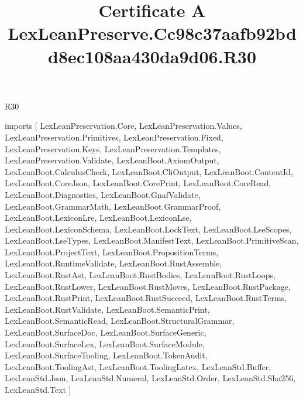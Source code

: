 \begin{lexlean}{R30}
\title{Certificate A LexLeanPreserve.Cc98c37aafb92bdd8ec108aa430da9d06.R30}
\begin{coremodule}
imports [
  LexLeanPreservation.Core,
  LexLeanPreservation.Values,
  LexLeanPreservation.Primitives,
  LexLeanPreservation.Fixed,
  LexLeanPreservation.Keys,
  LexLeanPreservation.Templates,
  LexLeanPreservation.Validate,
  LexLeanBoot.AxiomOutput,
  LexLeanBoot.CalculusCheck,
  LexLeanBoot.CliOutput,
  LexLeanBoot.ContentId,
  LexLeanBoot.CoreJson,
  LexLeanBoot.CorePrint,
  LexLeanBoot.CoreRead,
  LexLeanBoot.Diagnostics,
  LexLeanBoot.GnafValidate,
  LexLeanBoot.GrammarMath,
  LexLeanBoot.GrammarProof,
  LexLeanBoot.LexiconLre,
  LexLeanBoot.LexiconLse,
  LexLeanBoot.LexiconSchema,
  LexLeanBoot.LockText,
  LexLeanBoot.LseScopes,
  LexLeanBoot.LseTypes,
  LexLeanBoot.ManifestText,
  LexLeanBoot.PrimitiveScan,
  LexLeanBoot.ProjectText,
  LexLeanBoot.PropositionTerms,
  LexLeanBoot.RuntimeValidate,
  LexLeanBoot.RustAssemble,
  LexLeanBoot.RustAst,
  LexLeanBoot.RustBodies,
  LexLeanBoot.RustLoops,
  LexLeanBoot.RustLower,
  LexLeanBoot.RustMoves,
  LexLeanBoot.RustPackage,
  LexLeanBoot.RustPrint,
  LexLeanBoot.RustSucceed,
  LexLeanBoot.RustTerms,
  LexLeanBoot.RustValidate,
  LexLeanBoot.SemanticPrint,
  LexLeanBoot.SemanticRead,
  LexLeanBoot.StructuralGrammar,
  LexLeanBoot.SurfaceDoc,
  LexLeanBoot.SurfaceGeneric,
  LexLeanBoot.SurfaceLex,
  LexLeanBoot.SurfaceModule,
  LexLeanBoot.SurfaceTooling,
  LexLeanBoot.TokenAudit,
  LexLeanBoot.ToolingAst,
  LexLeanBoot.ToolingLatex,
  LexLeanStd.Buffer,
  LexLeanStd.Json,
  LexLeanStd.Numeral,
  LexLeanStd.Order,
  LexLeanStd.Sha256,
  LexLeanStd.Text
]


\end{coremodule}
\end{lexlean}
